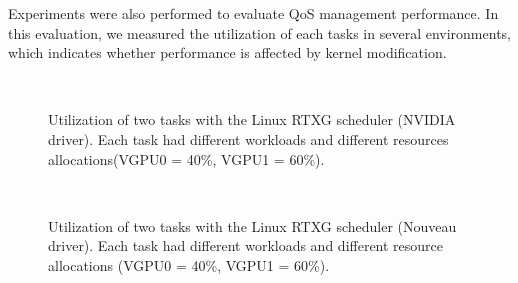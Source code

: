 Experiments were also performed to evaluate QoS management performance.
In this evaluation, we measured the utilization of each tasks in several environments,
which indicates whether performance is affected by kernel modification.
\begin{figure}[!t]
\begin{center}
\label{fig:fifo_rtx_nvidia} \\
\label{fig:band_rtx_nvidia}
\caption{Utilization of two tasks with the Linux RTXG scheduler (NVIDIA driver). Each task had different workloads and different resources allocations(VGPU0 = 40\%, VGPU1 = 60\%).}
\label{fig:rtx_nvidia}
\end{center}
\end{figure}

\begin{figure}[!t]
\begin{center}
\label{fig:fifo_rtx} \\
\label{fig:band_rtx}
\caption{Utilization of two tasks with the Linux RTXG scheduler (Nouveau driver). Each task had different workloads and different resource allocations (VGPU0 = 40\%, VGPU1 = 60\%).}
\label{fig:rtx_nouveau}
\end{center}
\end{figure}

